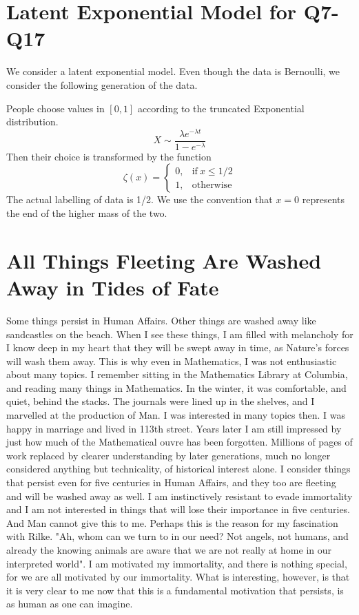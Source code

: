 \documentclass{amsart}
\begin{document}
\section{Latent Exponential Model for Q7-Q17}

We consider a latent exponential model.  Even though the data is Bernoulli, we consider the following generation of the data.

People choose values in $[0,1]$ according to the truncated Exponential distribution.
\[
X \sim \frac{\lambda e^{-\lambda t}}{1-e^{-\lambda}}
\]
Then their choice is transformed by the function
\[
\zeta( x ) = 
    \begin{cases}
      0, & \text{if}\ x \le 1/2 \\
      1, & \text{otherwise}
    \end{cases}
\]
The actual labelling of data is 1/2.  We use the convention that $x=0$ represents the end of the higher mass of the two.

\section{All Things Fleeting Are Washed Away in Tides of Fate}

Some things persist in Human Affairs.  Other things are washed away like sandcastles on the beach.  When I see these things, I am filled with melancholy for I know deep in my heart that they will be swept away in time, as Nature's forces will wash them away.  This is why even in Mathematics, I was not enthusiastic about many topics.  I remember sitting in the Mathematics Library at Columbia, and reading many things in Mathematics.  In the winter, it was comfortable, and quiet, behind the stacks.  The journals were lined up in the shelves, and I marvelled at the production of Man.  I was interested in many topics then.  I was happy in marriage and lived in 113th street.  Years later I am still impressed by just how much of the Mathematical ouvre has been forgotten.  Millions of pages of work replaced by clearer understanding by later generations, much no longer considered anything but technicality, of historical interest alone.  I consider things that persist even for five centuries in Human Affairs, and they too are fleeting and will be washed away as well.  I am instinctively resistant to evade immortality and I am not interested in things that will lose their importance in five centuries.  And Man cannot give this to me.  Perhaps this is the reason for my fascination with Rilke.  "Ah, whom can we turn to in our need?  Not angels, not humans, and already the knowing animals are aware that we are not really at home in our interpreted world".  I am motivated my immortality, and there is nothing special, for we are all motivated by our immortality.  What is interesting, however, is that it is very clear to me now that this is a fundamental motivation that persists, is as human as one can imagine.  
\end{document}
